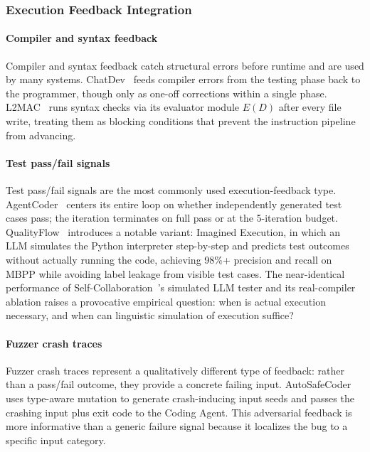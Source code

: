 \documentclass{llmxive}
\begin{document}
\subsubsection{Execution Feedback Integration}
\paragraph{Compiler and syntax feedback} Compiler and syntax
feedback catch structural errors before runtime and are used by
many systems. ChatDev~\cite{Qian2023ChatDev} feeds compiler
errors from the testing phase back to the programmer, though only
as one-off corrections within a single phase.
L2MAC~\cite{Holt2023L2MAC} runs syntax checks via its evaluator
module $E(D)$ after every file write, treating them as blocking
conditions that prevent the instruction pipeline from advancing.

\paragraph{Test pass/fail signals} Test pass/fail signals are the
most commonly used execution-feedback type.
AgentCoder~\cite{huang2023agentcoder} centers its entire loop on
whether independently generated test cases pass; the iteration
terminates on full pass or at the 5-iteration budget.
QualityFlow~\cite{Hu2025QualityFlow} introduces a notable
variant: Imagined Execution, in which an LLM simulates the Python
interpreter step-by-step and predicts test outcomes without
actually running the code, achieving 98\%+ precision and recall
on MBPP while avoiding label leakage from visible test cases.
The near-identical performance of
Self-Collaboration~\cite{Dong2024SelfCollaboration}'s simulated
LLM tester and its real-compiler ablation raises a provocative
empirical question: when is actual execution necessary, and when
can linguistic simulation of execution suffice?

\paragraph{Fuzzer crash traces} Fuzzer crash traces represent a
qualitatively different type of feedback: rather than a pass/fail
outcome, they provide a concrete failing input.
AutoSafeCoder~\cite{Nunez2024AutoSafeCoder} uses type-aware
mutation to generate crash-inducing input seeds and passes the
crashing input plus exit code to the Coding Agent. This
adversarial feedback is more informative than a generic failure
signal because it localizes the bug to a specific input category.
\end{document}
